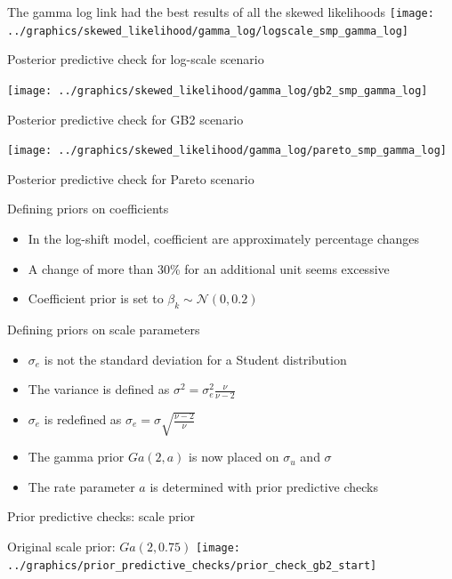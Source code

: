\begin{frame}
    \vspace{-0.5cm}
    \scriptsize{The gamma log link had the best results of all the skewed likelihoods}
    \centering
    \texttt{[image: ../graphics/skewed\_likelihood/gamma\_log/logscale\_smp\_gamma\_log]}

    \scriptsize{Posterior predictive check for log-scale scenario}

    \texttt{[image: ../graphics/skewed\_likelihood/gamma\_log/gb2\_smp\_gamma\_log]}

    \scriptsize{Posterior predictive check for GB2 scenario}

    \texttt{[image: ../graphics/skewed\_likelihood/gamma\_log/pareto\_smp\_gamma\_log]}

    \scriptsize{Posterior predictive check for Pareto scenario}

\end{frame}

\begin{frame}{Defining priors on coefficients}
    \begin{itemize}
        \item In the log-shift model, coefficient are approximately percentage changes
        \item A change of more than 30\% for an additional unit seems excessive
        \item Coefficient prior is set to $\beta_k \sim \mathcal N(0, 0.2)$
    \end{itemize}
\end{frame}

\begin{frame}{Defining priors on scale parameters}
    \begin{itemize}
        \item $\sigma_e$ is not the standard deviation for a Student distribution
        \item The variance is defined as $\sigma^2 = \sigma_e^2\frac {\nu} {\nu -2}$
        \item $\sigma_e$ is redefined as $\sigma_e = \sigma \sqrt{\frac{\nu -2}{\nu}}$
        \item The gamma prior $Ga(2, a)$ is now placed on $\sigma_u$ and $\sigma$
        \item The rate parameter $a$ is determined with prior predictive checks
    \end{itemize}
\end{frame}

\begin{frame}{Prior predictive checks: scale prior}

    \centering
    Original scale prior: $Ga(2, 0.75)$
    \texttt{[image: ../graphics/prior\_predictive\_checks/prior\_check\_gb2\_start]}
\end{frame}

